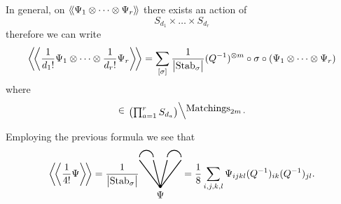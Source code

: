 In general, on $ \langle \! \langle { \Psi_1 \otimes \dots \otimes \Psi_r } \rangle \! \rangle$ there exists an action of
\begin{equation*}
  S_{d_1} \times \dots \times S_{d_r}
\end{equation*}
therefore we can write
\begin{equation*}
  \bigg \langle \! \bigg \langle {\frac{1}{d_1!} \Psi_1 \otimes \dots \otimes \frac{1}{d_r!} \Psi_r} \bigg \rangle \! \bigg \rangle
  = \sum_{[\sigma]} \frac{1}{\bigl| \operatorname{Stab}_{\sigma} \bigr|}
  (Q^{-1})^{\otimes m} \circ \sigma \circ (\Psi_1 \otimes \dots \otimes \Psi_r)
\end{equation*}
where
\begin{equation*}
  [\sigma] \in \lbigslant{\bigl( \prod_{a = 1}^r S_{d_a} \bigr)}{\text{Matchings}_{2m}}.
\end{equation*}

\begin{example}
  Employing the previous formula we see that
  \begin{equation*}
    \biggavg{\frac{1}{4!} \Psi} = \frac{1}{\bigl| \Stab_{\sigma} \bigr|}
    \begin{tikzpicture}[scale=.5, baseline=4mm]
      \draw[fill=black] (1.5, .1) circle (1mm);
      \draw[thick] (1.5, 0) node[anchor=north] {$\Psi$} -- (0, 2);
      \draw[thick] (1.5, 0) -- (1, 2);
      \draw[thick] (1.5, 0) -- (2, 2);
      \draw[thick] (1.5, 0) -- (3, 2);
      \draw[thick] (0, 2.2) arc (180:0:.5);
      \draw[thick] (2, 2.2) arc (180:0:.5);
    \end{tikzpicture}
    = \frac{1}{8} \sum_{i, j, k, l} \Psi_{ijkl} (Q^{-1})_{ik} (Q^{-1})_{jl}.
  \end{equation*}
\end{example}

